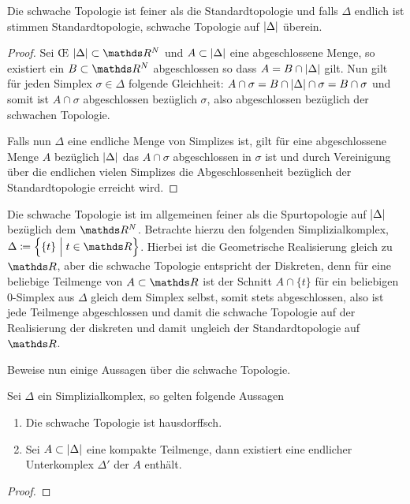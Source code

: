 \begin{Lem}
  Die schwache Topologie ist feiner als die Standardtopologie und
  falls $\Delta$ endlich ist stimmen Standardtopologie, schwache
  Topologie auf $\left| \Delta \right|$ überein.
  \begin{proof}
    Sei \OE\; $\gr{\Delta} \subset \R^N$ und $A \subset \left| \Delta \right|$
    eine abgeschlossene Menge, so existiert ein $B \subset \R^N$
    abgeschlossen so dass $A = B \cap \left| \Delta \right|$ gilt. Nun gilt für
    jeden Simplex $\sigma \in \Delta$ folgende Gleichheit:
    $A \cap \sigma = B \cap \left| \Delta \right| \cap \sigma = B \cap \sigma$
    und somit ist $A \cap \sigma$ abgeschlossen bezüglich $\sigma$,
    also abgeschlossen bezüglich der schwachen Topologie.
		
    Falls nun $\Delta$ eine endliche Menge von Simplizes ist, gilt für
    eine abgeschlossene Menge $A$ bezüglich $\left| \Delta \right|$ das
    $A \cap \sigma$ abgeschlossen in $\sigma$ ist und durch
    Vereinigung über die endlichen vielen Simplizes die
    Abgeschlossenheit bezüglich der Standardtopologie erreicht wird.
  \end{proof}
\end{Lem}

\begin{Bem}
  Die schwache Topologie ist im allgemeinen feiner als die
  Spurtopologie auf $\left| \Delta \right|$ bezüglich dem $\R^N$. Betrachte
  hierzu den folgenden Simplizialkomplex,
  $\Delta \coloneqq \set{ \{t\} }{t \in \R}$.  Hierbei ist die
  Geometrische Realisierung gleich zu $\R$, aber die schwache
  Topologie entspricht der Diskreten, denn für eine beliebige
  Teilmenge von $A \subset \R$ ist der Schnitt $A \cap \{ t \}$ für
  ein beliebigen $0$-Simplex aus $\Delta$ gleich dem Simplex selbst,
  somit stets abgeschlossen, also ist jede Teilmenge abgeschlossen und
  damit die schwache Topologie auf der Realisierung der diskreten und
  damit ungleich der Standardtopologie auf $\R$.
\end{Bem}

Beweise nun einige Aussagen über die schwache Topologie.

\begin{Satz}
  Sei $\Delta$ ein Simplizialkomplex, so gelten folgende Aussagen
  \begin{enumerate}[(1)]
        \item Die schwache Topologie ist hausdorffsch.
        \item Sei $A \subset \left| \Delta \right|$ eine kompakte Teilmenge,
          dann existiert eine endlicher Unterkomplex $\Delta'$ der $A$
          enthält.
	\end{enumerate}
	\begin{proof}
	\end{proof}
\end{Satz}



